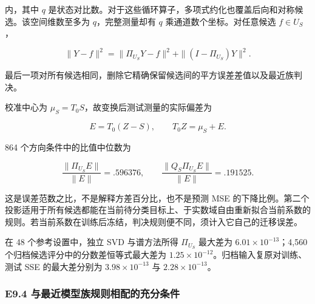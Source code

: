 \documentclass[11pt,a4paper]{article}
\begin{document}
\par
\noindent\begin{minipage}{\linewidth}

内，其中 \(q\)
是状态对比数。对于这些循环算子，多项式约化也覆盖后向和对称候选。该空间维数至多为
\(q\)，完整测量却有 \(q\) 乘通道数个坐标。对任意候选 \(f\in U_S\)，

\[
\|Y-f\|^2=\|\Pi_{U_S}Y-f\|^2+
\|(I-\Pi_{U_S})Y\|^2.
\]

\end{minipage}\par

最后一项对所有候选相同，删除它精确保留候选间的平方误差差值以及最近族判决。

\par
\noindent\begin{minipage}{\linewidth}

校准中心为 \(\mu_S=T_0S\)，故变换后测试测量的实际偏差为

\[
E=T_0(Z-S),\qquad T_0Z=\mu_S+E.
\]

\end{minipage}\par

\par
\noindent\begin{minipage}{\linewidth}

864 个方向条件中的比值中位数为

\[
\frac{\|\Pi_{U_S}E\|}{\|E\|}=.596376,
\qquad
\frac{\|Q_S\Pi_{U_S}E\|}{\|E\|}=.191525.
\]

\end{minipage}\par

这是误差范数之比，不是解释方差百分比，也不是预测 MSE
的下降比例。第二个投影适用于所有候选都能在当前待分类目标上、于实数域自由重新拟合当前系数的规则。若当前系数在训练后冻结，判决规则便不同，须计入它自己的迁移误差。

在 48 个参考设置中，独立 SVD 与谱方法所得 \(\Pi_{U_S}\) 最大差为
\(6.01\times10^{-13}\)；4,560 个归档候选评分中的分数差恒等式最大差为
\(1.25\times10^{-12}\)。归档输入复原对训练、测试 SSE 的最大差分别为
\(3.98\times10^{-13}\) 与 \(2.28\times10^{-13}\)。

\subsubsection{E9.4
与最近模型族规则相配的充分条件}\label{e9.4-ux4e0eux6700ux8fd1ux6a21ux578bux65cfux89c4ux5219ux76f8ux914dux7684ux5145ux5206ux6761ux4ef6}
\end{document}
